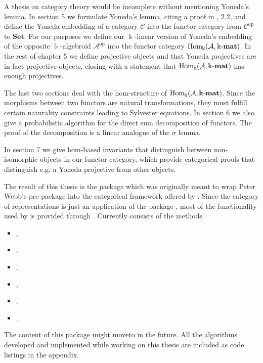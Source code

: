 A thesis on category theory would be incomplete without mentioning Yoneda's lemma. In section 5 we
formulate Yoneda's lemma, citing a proof in \cite{[context]}, 2.2, and define the Yoneda embedding of a category $\mathcal{C}$ into the
functor category from $\mathcal{C}^{\text{op}}$ to $\mathbf{Set}$. For our purposes we
define our $\Bbbk$-linear version of Yoneda's embedding of the opposite $\Bbbk$-algebroid $\mathcal{A}^{\text{op}}$
into the functor category $\mathrm{Hom_{\Bbbk}}(\mathcal{A},\Bbbk\textnormal{-}\mathbf{mat})$. In the rest of chapter 5 we define projective objects and that
Yoneda projectives are in fact projective objects, closing with a statement that $\mathrm{Hom_{\Bbbk}}(\mathcal{A},\Bbbk\textnormal{-}\mathbf{mat})$ has enough projectives.

The last two sections deal with the hom-structure of $\mathrm{Hom_{\Bbbk}}(\mathcal{A},\Bbbk\textnormal{-}\mathbf{mat})$. Since the morphisms between two
functors are natural transformations, they must fulfill certain naturality constraints leading to Sylvester equations. 
In section 6 we also give a probabilistic algorithm for the direct sum decomposition of functors. The proof of the decomposition is a linear
analogue of the $\sigma$ lemma.

In section 7 we give hom-based invariants that distinguish between non-isomorphic objects in our functor category, which provide 
categorical proofs that distinguish e.g. a Yoneda projective from other objects.

The result of this thesis is the \Gap package \CatReps which was originally meant to wrap Peter Webb's
pre-package \catreps into the categorical framework offered by \CAP. Since the category of representations is just an application of the package
\FunctorCategories, most of the functionality used by \CatReps is provided through \FunctorCategories.
Currently \CatReps consists of the methods
\begin{itemize}
\item {},
\item {},
\item {},
\item {},
\item {},
\item {}.
\end{itemize}
The content of this package might moveto \FunctorCategories in the future. All the algorithms developed and implemented while working on this
thesis are included as code listings in the appendix.
